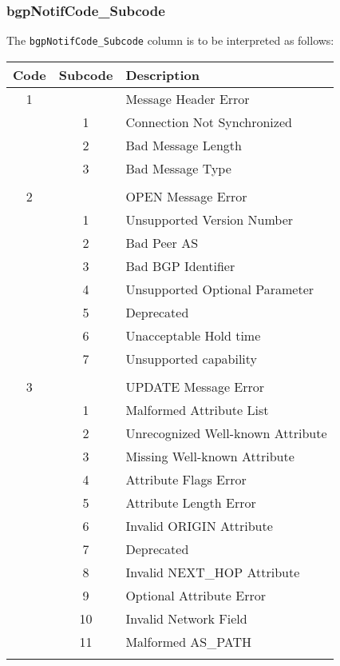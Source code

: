\documentclass[documentation]{subfiles}
\begin{document}
\subsubsection{bgpNotifCode\_Subcode}\label{bgpNotifCodeSubcode}
The {\tt bgpNotifCode\_Subcode} column is to be interpreted as follows:
\begin{longtable}{ccl}
    \toprule
    {\bf Code} & {\bf Subcode} & {\bf Description}\\
    \midrule\endhead%
    1 &    & Message Header Error\\
      &  1 & \qquad Connection Not Synchronized\\
      &  2 & \qquad Bad Message Length\\
      &  3 & \qquad Bad Message Type\\\\
    2 &    & OPEN Message Error\\
      &  1 & \qquad Unsupported Version Number\\
      &  2 & \qquad Bad Peer AS\\
      &  3 & \qquad Bad BGP Identifier\\
      &  4 & \qquad Unsupported Optional Parameter\\
      &  5 & \qquad Deprecated\\
      &  6 & \qquad Unacceptable Hold time\\
      &  7 & \qquad Unsupported capability\\\\
    3 &    & UPDATE Message Error\\
      &  1 & \qquad Malformed Attribute List\\
      &  2 & \qquad Unrecognized Well-known Attribute\\
      &  3 & \qquad Missing Well-known Attribute\\
      &  4 & \qquad Attribute Flags Error\\
      &  5 & \qquad Attribute Length Error\\
      &  6 & \qquad Invalid ORIGIN Attribute\\
      &  7 & \qquad Deprecated\\
      &  8 & \qquad Invalid NEXT\_HOP Attribute\\
      &  9 & \qquad Optional Attribute Error\\
      & 10 & \qquad Invalid Network Field\\
      & 11 & \qquad Malformed AS\_PATH\\\\

\end{longtable}
\end{document}
